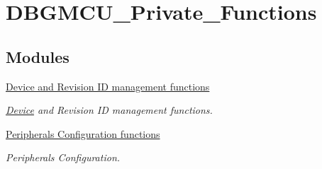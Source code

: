 \hypertarget{group___d_b_g_m_c_u___private___functions}{\section{D\-B\-G\-M\-C\-U\-\_\-\-Private\-\_\-\-Functions}
\label{group___d_b_g_m_c_u___private___functions}
}
\subsection*{Modules}
\begin{DoxyCompactItemize}
\item 
\hyperlink{group___d_b_g_m_c_u___group1}{Device and Revision I\-D management functions}
\begin{DoxyCompactList}\small\item\em \hyperlink{struct_device}{Device} and Revision I\-D management functions. \end{DoxyCompactList}\item 
\hyperlink{group___d_b_g_m_c_u___group2}{Peripherals Configuration functions}
\begin{DoxyCompactList}\small\item\em Peripherals Configuration. \end{DoxyCompactList}\end{DoxyCompactItemize}
